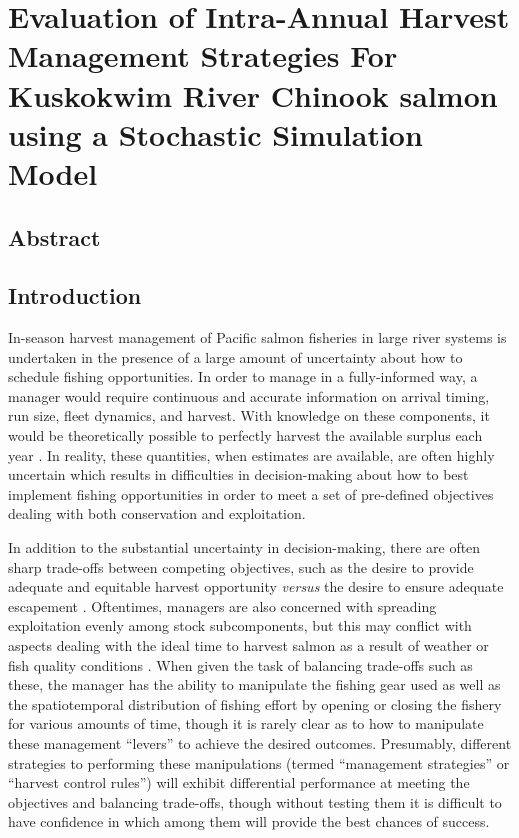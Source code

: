\documentclass[12pt,]{book}
\theoremstyle{definition}
\theoremstyle{definition}
\theoremstyle{definition}
\theoremstyle{remark}
\begin{document}
\setlength{\parskip}{0pt plus 0pt minus 0pt}

\doublespacing

\chapter{Evaluation of Intra-Annual Harvest Management Strategies For
Kuskokwim River Chinook salmon using a Stochastic Simulation
Model}\label{ch3}

\section*{Abstract}\label{abstract}

\newpage

\section{Introduction}\label{introduction}

\noindent
In-season harvest management of Pacific salmon fisheries in large river
systems is undertaken in the presence of a large amount of uncertainty
about how to schedule fishing opportunities. In order to manage in a
fully-informed way, a manager would require continuous and accurate
information on arrival timing, run size, fleet dynamics, and harvest.
With knowledge on these components, it would be theoretically possible
to perfectly harvest the available surplus each year
\citep{adkison-cunningham-2015}. In reality, these quantities, when
estimates are available, are often highly uncertain
\citep{adkison-peterman-2000, flynn-hilborn-2004, hyun-etal-2012} which
results in difficulties in decision-making about how to best implement
fishing opportunities in order to meet a set of pre-defined objectives
dealing with both conservation and exploitation.

In addition to the substantial uncertainty in decision-making, there are
often sharp trade-offs between competing objectives, such as the desire
to provide adequate and equitable harvest opportunity \emph{versus} the
desire to ensure adequate escapement \citep{catalano-jones-2014}.
Oftentimes, managers are also concerned with spreading exploitation
evenly among stock subcomponents, but this may conflict with aspects
dealing with the ideal time to harvest salmon as a result of weather or
fish quality conditions
\citep{carney-adkison-2014, adkison-cunningham-2015}. When given the
task of balancing trade-offs such as these, the manager has the ability
to manipulate the fishing gear used as well as the spatiotemporal
distribution of fishing effort by opening or closing the fishery for
various amounts of time, though it is rarely clear as to how to
manipulate these management ``levers'' to achieve the desired outcomes.
Presumably, different strategies to performing these manipulations
(termed ``management strategies'' or ``harvest control rules'') will
exhibit differential performance at meeting the objectives and balancing
trade-offs, though without testing them it is difficult to have
confidence in which among them will provide the best chances of success.
\end{document}
